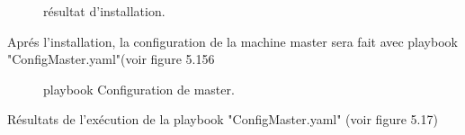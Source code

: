 {\begin{figure}[H]
\begin{center}
    \end{center}
    \caption{résultat d'installation.}
   \end{figure}
    Aprés l'installation, la configuration de la machine master sera fait avec playbook "ConfigMaster.yaml"(voir figure 5.156
   \begin{figure}[H]
    \begin{center}
    \end{center}
    \caption{playbook Configuration de master.}
   \end{figure}
    \indent\indent Résultats de l'exécution de la playbook "ConfigMaster.yaml" (voir figure 5.17)
    \begin{figure}[H]
        \begin{center}

\end{center}
\end{figure}}
